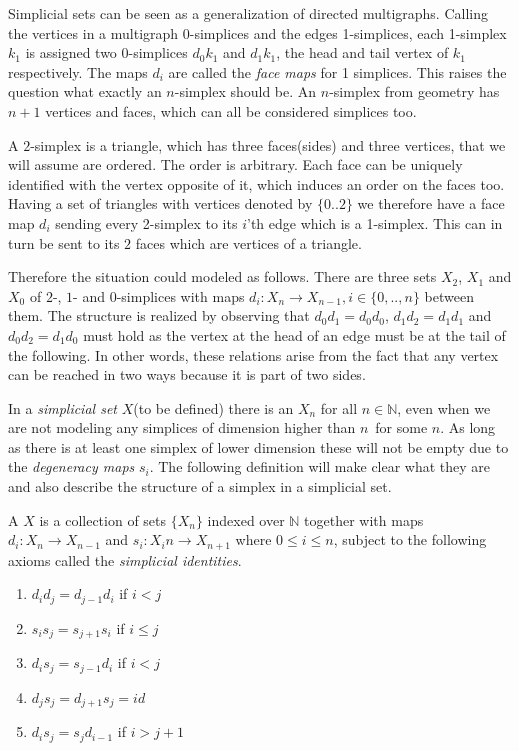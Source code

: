 \documentclass[../../main.tex]{subfiles}
\begin{document}
          
    Simplicial sets can be seen as a generalization of directed multigraphs. Calling the vertices in a multigraph 0-simplices and the edges 1-simplices, each 1-simplex $k_1$ is assigned two 0-simplices $d_0k_1$ and $d_1k_1$, the head and tail vertex of $k_1$ respectively. The maps $d_i$ are called the \emph{face maps} for 1 simplices. This raises the question what exactly an $n$-simplex should be. An $n$-simplex from geometry has $n+1$ vertices and faces, which can all be considered simplices too.

    \begin{example}[2-simplex]
        A $2$-simplex is a triangle, which has three faces(sides) and three vertices, that we will assume are ordered. The order is arbitrary. Each face can be uniquely identified with the vertex opposite of it, which induces an order on the faces too. Having a set of triangles with vertices denoted by $\{0..2\}$ we therefore have a face map $d_i$ sending every 2-simplex to its $i$'th edge which is a 1-simplex. This can in turn be sent to its $2$ faces which are vertices of a triangle. 
        
        Therefore the situation could modeled as follows. There are three sets $X_2$, $X_1$ and $X_0$ of $2$-, $1$- and $0$-simplices with maps $d_i: X_n \to X_{n-1}, i \in \{0,.., n\}$ between them. The structure is realized by observing that $d_0d_1 = d_0d_0$, $d_1d_2 = d_1d_1$ and $d_0d_2 = d_1d_0$ must hold as the vertex at the head of an edge must be at the tail of the following. In other words, these relations arise from the fact that any vertex can be reached in two ways because it is part of two sides.
    \end{example}

    In a \emph{simplicial set} $X$(to be defined) there is an $X_n$ for all $n \in \mathbb{N}$, even when we are not modeling any simplices of dimension higher than $n$ for some $n$. As long as there is at least one simplex of lower dimension these will not be empty due to the \emph{degeneracy maps} $s_i$. The following definition will make clear what they are and also describe the structure of a simplex in a simplicial set.

    \begin{definition}\label{simplicial-set}
        A  $X$ is a collection of sets $\{X_n\}$ indexed over $\mathbb{N}$ together with maps $d_i: X_n \to X_{n-1}$ and $s_i: X_in\to X_{n+1}$ where $0 \leq i \leq n$, subject to the following axioms called the \emph{simplicial identities}.
        
        \begin{enumerate}
            \item $d_id_j = d_{j-1}d_i$ if $i < j$
            \item $s_is_j = s_{j+1}s_i$ if $i \leq j$
            \item $d_is_j = s_{j-1}d_i$ if $i < j$
            \item $d_js_j = d_{j+1}s_j = id$
            \item $d_is_j = s_jd_{i-1}$ if $i > j+1$
        \end{enumerate}
    \end{definition}
\end{document}
